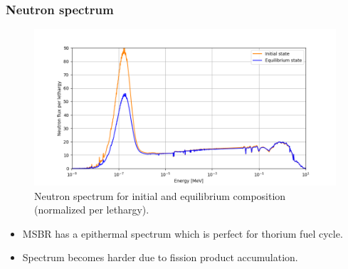 \begin{frame}
  \frametitle{Neutron spectrum}
   \vspace{-0.5in}
  \begin{figure}[t]
   \hspace*{-0.39in}
   \includegraphics[height=0.8\textheight]{./images/spectrum.png}
   \vspace{-0.1in}
   \caption{Neutron spectrum for initial and equilibrium composition (normalized per lethargy).}
    \end{figure}
    \vspace{-0.1in}
    \begin{itemize}
       \item \gls{MSBR} has a epithermal spectrum which is perfect for thorium fuel cycle.
       \item Spectrum becomes harder due to fission product accumulation.
    \end{itemize}   
\end{frame}

